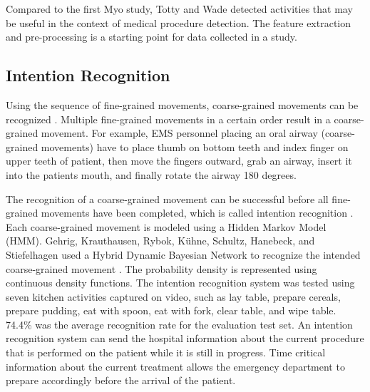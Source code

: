 \par Compared to the first Myo study, Totty and Wade detected activities that may be useful in the context of medical procedure detection. The feature extraction and pre-processing is a starting point for data collected in a study.
\subsection{Intention Recognition}
\par Using the sequence of fine-grained movements, coarse-grained movements can be recognized \cite{Dirk2010}. Multiple fine-grained movements in a certain order result in a coarse-grained movement. For example, EMS personnel placing an oral airway (coarse-grained movements) have to place thumb on bottom teeth and index finger on upper teeth of patient, then move the fingers outward, grab an airway, insert it into the patients mouth, and finally rotate the airway 180 degrees.
\par The recognition of a coarse-grained movement can be successful before all fine-grained movements have been completed, which is called intention recognition \cite{Schrempf2005}. Each coarse-grained movement is modeled using a Hidden Markov Model (HMM). Gehrig, Krauthausen, Rybok, K{\"{u}}hne, Schultz, Hanebeck, and Stiefelhagen used a Hybrid Dynamic Bayesian Network to recognize the intended coarse-grained movement \cite{Gehrig2011}. The probability density is represented using continuous density functions. The intention recognition system was tested using seven kitchen activities captured on video, such as lay table, prepare cereals, prepare pudding, eat with spoon, eat with fork, clear table, and wipe table. 74.4\% was the average recognition rate for the evaluation test set. An intention recognition system can send the hospital information about the current procedure that is performed on the patient while it is still in progress. Time critical information about the current treatment allows the emergency department to prepare accordingly before the arrival of the patient.
